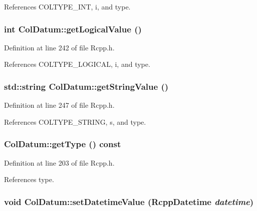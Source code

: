 References COLTYPE\_\-INT, i, and type.\hypertarget{classColDatum_df81b2aed6f8e19b6f36310288991f38}{
\subsubsection[{getLogicalValue}]{\setlength{\rightskip}{0pt plus 5cm}int ColDatum::getLogicalValue ()}}
\label{classColDatum_df81b2aed6f8e19b6f36310288991f38}




Definition at line 242 of file Rcpp.h.

References COLTYPE\_\-LOGICAL, i, and type.\hypertarget{classColDatum_d0d76d861441151f31cf42acff4b8c0f}{
\subsubsection[{getStringValue}]{\setlength{\rightskip}{0pt plus 5cm}std::string ColDatum::getStringValue ()}}
\label{classColDatum_d0d76d861441151f31cf42acff4b8c0f}




Definition at line 247 of file Rcpp.h.

References COLTYPE\_\-STRING, s, and type.\hypertarget{classColDatum_ae862d41617b3ae39f88b5b729ccccc3}{
\subsubsection[{getType}]{ ColDatum::getType () const}}
\label{classColDatum_ae862d41617b3ae39f88b5b729ccccc3}




Definition at line 203 of file Rcpp.h.

References type.\hypertarget{classColDatum_5803eb7a89dc467b88d7d412462c6fb5}{
\subsubsection[{setDatetimeValue}]{\setlength{\rightskip}{0pt plus 5cm}void ColDatum::setDatetimeValue ({\bf RcppDatetime} {\em datetime})}}
\label{classColDatum_5803eb7a89dc467b88d7d412462c6fb5}





